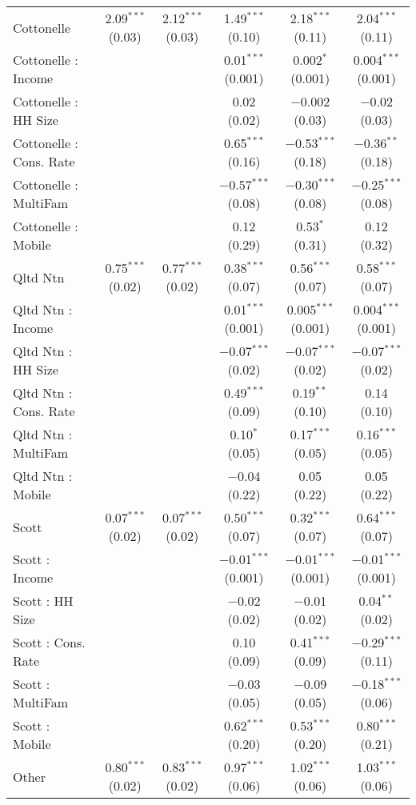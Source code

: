 \begin{table}[!htbp]
\begin{tabular}{@{\extracolsep{5pt}}lccccc}
  Cottonelle & 2.09$^{***}$ (0.03) & 2.12$^{***}$ (0.03) & 1.49$^{***}$ (0.10) & 2.18$^{***}$ (0.11) & 2.04$^{***}$ (0.11) \\ 
  Cottonelle : Income &  &  & 0.01$^{***}$ (0.001) & 0.002$^{*}$ (0.001) & 0.004$^{***}$ (0.001) \\ 
  Cottonelle : HH Size &  &  & 0.02 (0.02) & $-$0.002 (0.03) & $-$0.02 (0.03) \\ 
  Cottonelle : Cons. Rate &  &  & 0.65$^{***}$ (0.16) & $-$0.53$^{***}$ (0.18) & $-$0.36$^{**}$ (0.18) \\ 
  Cottonelle : MultiFam &  &  & $-$0.57$^{***}$ (0.08) & $-$0.30$^{***}$ (0.08) & $-$0.25$^{***}$ (0.08) \\ 
  Cottonelle : Mobile &  &  & 0.12 (0.29) & 0.53$^{*}$ (0.31) & 0.12 (0.32) \\ 
  Qltd Ntn & 0.75$^{***}$ (0.02) & 0.77$^{***}$ (0.02) & 0.38$^{***}$ (0.07) & 0.56$^{***}$ (0.07) & 0.58$^{***}$ (0.07) \\ 
  Qltd Ntn : Income &  &  & 0.01$^{***}$ (0.001) & 0.005$^{***}$ (0.001) & 0.004$^{***}$ (0.001) \\ 
  Qltd Ntn : HH Size &  &  & $-$0.07$^{***}$ (0.02) & $-$0.07$^{***}$ (0.02) & $-$0.07$^{***}$ (0.02) \\ 
  Qltd Ntn : Cons. Rate &  &  & 0.49$^{***}$ (0.09) & 0.19$^{**}$ (0.10) & 0.14 (0.10) \\ 
  Qltd Ntn : MultiFam &  &  & 0.10$^{*}$ (0.05) & 0.17$^{***}$ (0.05) & 0.16$^{***}$ (0.05) \\ 
  Qltd Ntn : Mobile &  &  & $-$0.04 (0.22) & 0.05 (0.22) & 0.05 (0.22) \\ 
  Scott & 0.07$^{***}$ (0.02) & 0.07$^{***}$ (0.02) & 0.50$^{***}$ (0.07) & 0.32$^{***}$ (0.07) & 0.64$^{***}$ (0.07) \\ 
  Scott : Income &  &  & $-$0.01$^{***}$ (0.001) & $-$0.01$^{***}$ (0.001) & $-$0.01$^{***}$ (0.001) \\ 
  Scott : HH Size &  &  & $-$0.02 (0.02) & $-$0.01 (0.02) & 0.04$^{**}$ (0.02) \\ 
  Scott : Cons. Rate &  &  & 0.10 (0.09) & 0.41$^{***}$ (0.09) & $-$0.29$^{***}$ (0.11) \\ 
  Scott : MultiFam &  &  & $-$0.03 (0.05) & $-$0.09 (0.05) & $-$0.18$^{***}$ (0.06) \\ 
  Scott : Mobile &  &  & 0.62$^{***}$ (0.20) & 0.53$^{***}$ (0.20) & 0.80$^{***}$ (0.21) \\ 
  Other & 0.80$^{***}$ (0.02) & 0.83$^{***}$ (0.02) & 0.97$^{***}$ (0.06) & 1.02$^{***}$ (0.06) & 1.03$^{***}$ (0.06) \\ 

\end{tabular}
\end{table}
